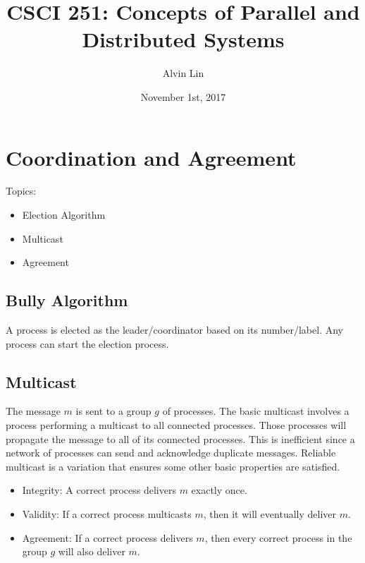 \documentclass{math}
\title{CSCI 251: Concepts of Parallel and Distributed Systems}
\author{Alvin Lin}
\date{November 1st, 2017}
\begin{document}
\maketitle

\section*{Coordination and Agreement}
Topics:
\begin{itemize}
  \item Election Algorithm
  \item Multicast
  \item Agreement
\end{itemize}

\subsection*{Bully Algorithm}
A process is elected as the leader/coordinator based on its number/label.
Any process can start the election process.

\subsection*{Multicast}
The message \( m \) is sent to a group \( g \) of processes. The basic multicast
involves a process performing a multicast to all connected processes. Those
processes will propagate the message to all of its connected processes. This
is inefficient since a network of processes can send and acknowledge duplicate
messages. Reliable multicast is a variation that ensures some other basic
properties are satisfied.
\begin{itemize}
  \item Integrity: A correct process delivers \( m \) exactly once.
  \item Validity: If a correct process multicasts \( m \), then it will
  eventually deliver \( m \).
  \item Agreement: If a correct process delivers \( m \), then every correct
  process in the group \( g \) will also deliver \( m \).
\end{itemize}
\end{document}

